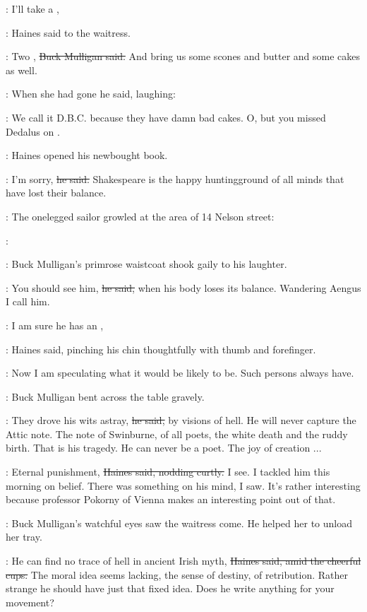 \haines:
I'll take a ,

:
Haines said to the waitress.

\mulligan:
Two ,
\sout{Buck Mulligan said.}
And bring us some scones and butter
and some cakes as well.

:
When she had gone
he said, laughing:

\mulligan:
We call it D.B.C. because they have damn bad cakes.
O, but you missed
Dedalus on .

:
Haines opened his newbought book.%

\haines:
I'm sorry,
\sout{he said.}
Shakespeare is the happy huntingground of all minds
that have lost their balance.

\begin{mdframed}
    :
    The onelegged sailor growled at the area of 14 Nelson street:

    \sailor:
\end{mdframed}

:
Buck Mulligan's primrose waistcoat shook gaily to his laughter.

\mulligan:
You should see him,
\sout{he said,}
when his body loses its balance.
Wandering Aengus I call him.

\haines:
I am sure he has an ,

:
Haines said,
pinching his chin thoughtfully with thumb and forefinger.

\haines:
Now I am speculating what it would be likely to be.
Such persons always have.

:
Buck Mulligan bent across the table gravely.

\mulligan:
They drove his wits astray,
\sout{he said,}
by visions of hell.
He will never capture the Attic note.
The note of Swinburne,
of all poets,
the white death and the ruddy birth.
That is his tragedy.
He can never be a poet.
The joy of creation ...

\haines:
Eternal punishment,
\sout{Haines said,
nodding curtly.}
I see.
I tackled him
this morning on belief.
There was something on his mind, I saw.
It's rather interesting
because professor Pokorny of Vienna
makes an interesting point out of that.

:
Buck Mulligan's watchful eyes saw the waitress come.
He helped her to unload her tray.

\haines:
He can find no trace of hell in ancient Irish myth,
\sout{Haines said,
amid the cheerful cups.}
The moral idea seems lacking,
the sense of destiny, of retribution.
Rather strange he should have just that fixed idea.
Does he write anything for your movement?

